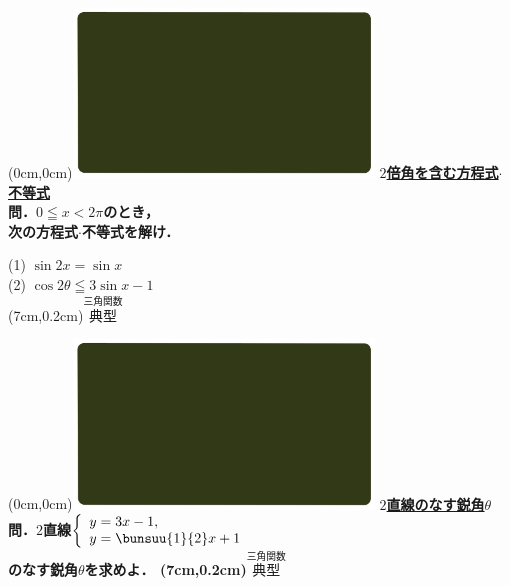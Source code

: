 \documentclass[10pt,
fleqn,
dvipdfmx,
uplatex
]{jsarticle}
\begin{document}
\newpage

\at(0cm,0cm){\includegraphics[width=8cm,bb=0 0 1920 1080]{./youtube/thumbnails/templates/smart_background/三角関数.jpeg}}
{\color{orange}\bf\boldmath\Large\underline{$2$倍角を含む方程式$\cdot$不等式}}\vspace{0.3zw}\\
\large 
\bf\boldmath 問．$0\leqq x<2\pi$のとき，\\
\hfill 次の方程式$\cdot$不等式を解け．

\LARGE
(1)  $\sin 2x=\sin x$\\
(2)  $\cos 2\theta \leqq 3\sin x-1$\\

\at(7cm,0.2cm){\small\color{bradorange}$\overset{\text{三角関数}}{\text{典型}}$}

\newpage

\at(0cm,0cm){\includegraphics[width=8cm,bb=0 0 1920 1080]{./youtube/thumbnails/templates/smart_background/三角関数.jpeg}}
{\color{orange}\bf\boldmath\LARGE\underline{$2$直線のなす鋭角$\theta$}}\vspace{0.3zw}\\
\LARGE 
\bf\boldmath 問．$2$直線$\left\{\begin{array}{l}y=3x-1,\;\\y=\bunsuu{1}{2}x+1\end{array}\right.$\vspace{0.3zw}\\
\hfill のなす鋭角$\theta$を求めよ．
\at(7cm,0.2cm){\small\color{bradorange}$\overset{\text{三角関数}}{\text{典型}}$}

\newpage
\end{document}
